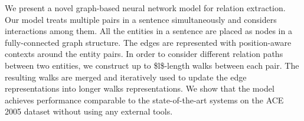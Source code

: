 We present a novel graph-based neural network model for relation extraction. Our model treats multiple pairs in a sentence simultaneously and considers interactions among them. All the entities in a sentence are placed as nodes in a fully-connected graph structure. The edges are represented with position-aware contexts around the entity pairs. In order to consider different relation paths between two entities, we construct up to \$l\$-length walks between each pair. The resulting walks are merged and iteratively used to update the edge representations into longer walks representations. We show that the model achieves performance comparable to the state-of-the-art systems on the ACE 2005 dataset without using any external tools.
